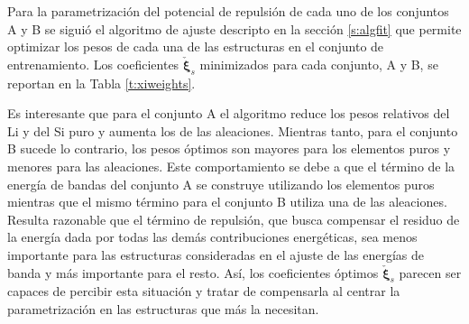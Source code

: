 Para la parametrización del potencial de repulsión de cada uno de los conjuntos 
A y B se siguió el algoritmo de ajuste descripto en la sección \ref{s:algfit}
que permite optimizar los pesos de cada una de las estructuras en el conjunto de 
entrenamiento. Los coeficientes $\check{\boldsymbol{\xi}}_s$ minimizados para cada
conjunto, A y B, se reportan en la Tabla \ref{t:xiweights}.
\begin{table}[h!]
    \centering
    \caption{Pesos óptimos, $\check{\boldsymbol{\xi}}_s$, de cada conjunto.}
    \setlength\extrarowheight{2pt}
    \label{t:xiweights}
\end{table}
Es interesante que para el conjunto A el algoritmo reduce los pesos relativos del 
Li y del Si puro y aumenta los de las aleaciones. Mientras tanto, para el conjunto 
B sucede lo contrario, los pesos óptimos son mayores para los elementos puros y
menores para las aleaciones. Este comportamiento se debe a que el término de la 
energía de bandas del conjunto A se construye utilizando los elementos puros 
mientras que el mismo término para el conjunto B utiliza una de las aleaciones. 
Resulta razonable que el término de repulsión, que busca compensar el residuo de la 
energía dada por todas las demás contribuciones energéticas, sea menos importante 
para las estructuras consideradas en el ajuste de las energías de banda y más 
importante para el resto. Así, los coeficientes óptimos $\check{\boldsymbol{\xi}}_s$ 
parecen ser capaces de percibir esta situación y tratar de compensarla al centrar 
la parametrización en las estructuras que más la necesitan.

